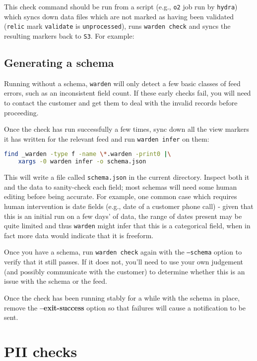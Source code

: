 \documentclass[a4paper]{article}
\begin{document}
This check command should be run from a script (e.g., \texttt{o2} job
run by \texttt{hydra}) which syncs down data files which are not
marked as having been validated (\texttt{relic} mark \texttt{validate}
is \texttt{unprocessed}), runs \texttt{warden check} and syncs the
resulting markers back to \texttt{S3}. For example:



\subsection{Generating a schema}

Running without a schema, \texttt{warden} will only detect a few
basic classes of feed errors, such as an inconsistent field count. If
these early checks fail, you will need to contact the customer and get
them to deal with the invalid records before proceeding.

Once the check has run successfully a few times, sync down all the
view markers it has written for the relevant feed and run
\texttt{warden infer} on them:

\begin{lstlisting}[language=bash]
find _warden -type f -name \*.warden -print0 |\
    xargs -0 warden infer -o schema.json
\end{lstlisting}

This will write a file called \texttt{schema.json} in the current
directory. Inspect both it and the data to sanity-check each field;
most schemas will need some human editing before being accurate. For
example, one common case which requires human intervention is date
fields (e.g., date of a customer phone call) - given that this is an
initial run on a few days' of data, the range of dates present may be
quite limited and thus \texttt{warden} might infer that this is a
categorical field, when in fact more data would indicate that it is
freeform.

Once you have a schema, run \texttt{warden check} again with the
\texttt{--schema} option to verify that it still passes. If it does
not, you'll need to use your own judgement (and possibly communicate
with the customer) to determine whether this is an issue with the
schema or the feed.

Once the check has been running stably for a while with the schema in
place, remove the \textbf{--exit-success} option so that failures will
cause a notification to be sent.

\section{PII checks}
\end{document}
